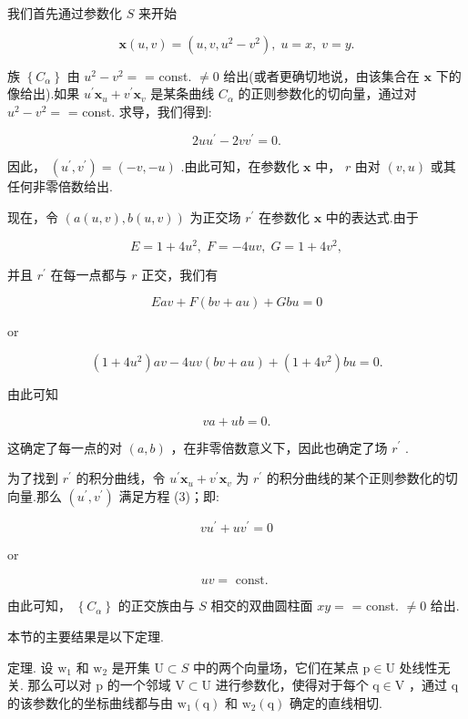 我们首先通过参数化 \(S\) 来开始

\[
\mathbf{x}\left( {u,v}\right)  = \left( {u,v,{u}^{2} - {v}^{2}}\right) ,\;u = x,\;v = y.
\]

族 \(\left\{  {C}_{\alpha }\right\}\) 由 \({u}^{2} - {v}^{2} =\) = const. \(\neq  0\) 给出(或者更确切地说，由该集合在 \(\mathbf{x}\) 下的像给出).如果 \({u}^{\prime }{\mathbf{x}}_{u} + {v}^{\prime }{\mathbf{x}}_{v}\) 是某条曲线 \({C}_{\alpha }\) 的正则参数化的切向量，通过对 \({u}^{2} - {v}^{2} =\) = const. 求导，我们得到:

\[
{2u}{u}^{\prime } - {2v}{v}^{\prime } = 0.
\]

因此， \(\left( {{u}^{\prime },{v}^{\prime }}\right)  = \left( {-v, - u}\right)\) .由此可知，在参数化 \(\mathbf{x}\) 中， \(r\) 由对 \(\left( {v,u}\right)\) 或其任何非零倍数给出.

现在，令 \(\left( {a\left( {u,v}\right) ,b\left( {u,v}\right) }\right)\) 为正交场 \({r}^{\prime }\) 在参数化 \(\mathbf{x}\) 中的表达式.由于

\[
E = 1 + 4{u}^{2},\;F =  - {4uv},\;G = 1 + 4{v}^{2},
\]

并且 \({r}^{\prime }\) 在每一点都与 \(r\) 正交，我们有

\[
{Eav} + F\left( {{bv} + {au}}\right)  + {Gbu} = 0
\]

or

\[
\left( {1 + 4{u}^{2}}\right) {av} - {4uv}\left( {{bv} + {au}}\right)  + \left( {1 + 4{v}^{2}}\right) {bu} = 0.
\]

由此可知

\[
{va} + {ub} = 0. \tag{3}
\]

这确定了每一点的对 \(\left( {a,b}\right)\) ，在非零倍数意义下，因此也确定了场 \({r}^{\prime }\) .

为了找到 \({r}^{\prime }\) 的积分曲线，令 \({u}^{\prime }{\mathbf{x}}_{u} + {v}^{\prime }{\mathbf{x}}_{v}\) 为 \({r}^{\prime }\) 的积分曲线的某个正则参数化的切向量.那么 \(\left( {{u}^{\prime },{v}^{\prime }}\right)\) 满足方程 (3)；即:

\[
v{u}^{\prime } + u{v}^{\prime } = 0
\]

or

\[
{uv} = \text{ const. }
\]

由此可知， \(\left\{  {C}_{\alpha }\right\}\) 的正交族由与 \(S\) 相交的双曲圆柱面 \({xy} =\) = const. \(\neq  0\) 给出.

本节的主要结果是以下定理.

定理. 设 \({\mathrm{w}}_{1}\) 和 \({\mathrm{w}}_{2}\) 是开集 \(\mathrm{U} \subset  S\) 中的两个向量场，它们在某点 \(\mathrm{p} \in  \mathrm{U}\) 处线性无关. 那么可以对 \(\mathrm{p}\) 的一个邻域 \(\mathrm{V} \subset  \mathrm{U}\) 进行参数化，使得对于每个 \(\mathrm{q} \in  \mathrm{V}\) ，通过 \(\mathrm{q}\) 的该参数化的坐标曲线都与由 \({\mathrm{w}}_{1}\left( \mathrm{q}\right)\) 和 \({\mathrm{w}}_{2}\left( \mathrm{q}\right)\) 确定的直线相切.

